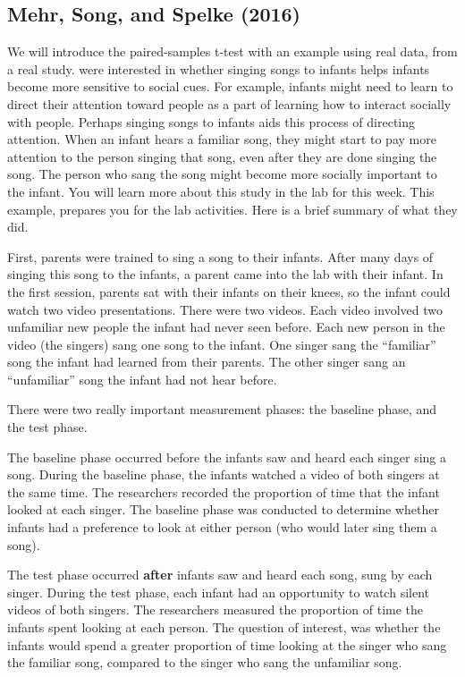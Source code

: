 \documentclass[
]{book}
\begin{document}
\subsection{Mehr, Song, and Spelke (2016)}\label{mehr-song-and-spelke-2016}

We will introduce the paired-samples t-test with an example using real data, from a real study. \citet{mehr20165} were interested in whether singing songs to infants helps infants become more sensitive to social cues. For example, infants might need to learn to direct their attention toward people as a part of learning how to interact socially with people. Perhaps singing songs to infants aids this process of directing attention. When an infant hears a familiar song, they might start to pay more attention to the person singing that song, even after they are done singing the song. The person who sang the song might become more socially important to the infant. You will learn more about this study in the lab for this week. This example, prepares you for the lab activities. Here is a brief summary of what they did.

First, parents were trained to sing a song to their infants. After many days of singing this song to the infants, a parent came into the lab with their infant. In the first session, parents sat with their infants on their knees, so the infant could watch two video presentations. There were two videos. Each video involved two unfamiliar new people the infant had never seen before. Each new person in the video (the singers) sang one song to the infant. One singer sang the ``familiar'' song the infant had learned from their parents. The other singer sang an ``unfamiliar'' song the infant had not hear before.

There were two really important measurement phases: the baseline phase, and the test phase.

The baseline phase occurred before the infants saw and heard each singer sing a song. During the baseline phase, the infants watched a video of both singers at the same time. The researchers recorded the proportion of time that the infant looked at each singer. The baseline phase was conducted to determine whether infants had a preference to look at either person (who would later sing them a song).

The test phase occurred \textbf{after} infants saw and heard each song, sung by each singer. During the test phase, each infant had an opportunity to watch silent videos of both singers. The researchers measured the proportion of time the infants spent looking at each person. The question of interest, was whether the infants would spend a greater proportion of time looking at the singer who sang the familiar song, compared to the singer who sang the unfamiliar song.
\end{document}
